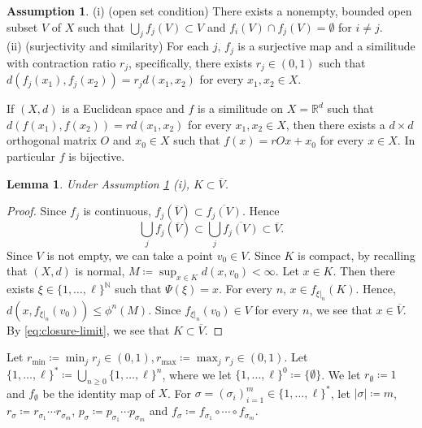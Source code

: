 \documentclass[a4paper, reqno, 11pt]{amsart}
\newtheorem{Lem}[Thm]{Lemma}
\theoremstyle{definition}
\newtheorem{Ass}[Thm]{Assumption}
\begin{document}
\begin{Ass}\label{ass:additional-f}
(i) (open set condition)  There exists a nonempty, bounded open subset $V$ of $X$ such that $\bigcup_j f_j (V) \subset V$ and 
$f_i (V) \cap f_j (V) = \emptyset$ for $i \ne j$. \\
(ii) (surjectivity and similarity) For each $j$, $f_j$ is a surjective map and a similitude with contraction ratio $r_j$, specifically, 
there exists $r_j \in (0,1)$ such that $d(f_j (x_1), f_j (x_2)) = r_j d(x_1, x_2)$ for every $x_1, x_2 \in X$. 
\end{Ass}

If $(X,d)$ is a Euclidean space and $f$ is a similitude on $X = \mathbb{R}^d$ such that $d(f(x_1), f(x_2)) = r d(x_1, x_2)$ for every $x_1, x_2 \in X$, 
then there exists a $d \times d$ orthogonal matrix $O$ and $x_0 \in X$ such that $f(x) = rOx + x_0$ for every $x \in X$. 
In particular $f$ is bijective. 

\begin{Lem}\label{lem:K-included}
Under Assumption \ref{ass:additional-f} (i), $K \subset \overline{V}$. 
\end{Lem}

\begin{proof}
Since $f_j$ is continuous, $f_j (\overline{V}) \subset \overline{f_j (V)}$. 
Hence  
\[ \bigcup_j f_j (\overline{V}) \subset \bigcup_j \overline{f_j (V)} \subset \overline{V}.\]  
Since $V$ is not empty, we can take a point $v_0 \in V$. 
Since $K$ is compact, by recalling that $(X,d)$ is normal, $M \coloneqq \sup_{x \in K} d(x, v_0) < \infty$. 
Let $x \in K$. 
Then  there exists $\xi \in \{1,\dots, \ell\}^{\mathbb N}$ such that $\Psi(\xi) = x$. 
For every $n$, $x \in f_{\xi|_n} (K)$. 
Hence, $d(x,  f_{\xi|_n}(v_0)) \le \phi^n (M)$. 
Since $ f_{\xi|_n}(v_0) \in V$ for every $n$, we see that $x \in \overline{V}$. 
By \eqref{eq:closure-limit}, we see that $K \subset \overline{V}$. 
\end{proof}

Let $r_{\min} \coloneqq \min_j r_j \in  (0,1), r_{\max} \coloneqq \max_j r_j \in (0,1)$. 
Let $\{1,\dots, \ell\}^{*} \coloneqq \bigcup_{n \ge 0} \{1,\dots, \ell\}^{n}$, where we let $\{1,\dots,\ell\}^{0} \coloneqq \{\emptyset\}$. 
We let $r_{\emptyset} \coloneqq 1$ and $f_{\emptyset}$ be the identity map of $X$. 
For $\sigma = (\sigma_i)_{i=1}^{m} \in  \{1,\dots, \ell\}^{*}$, 
let $|\sigma| \coloneqq m$, $r_{\sigma} \coloneqq r_{\sigma_1} \cdots r_{\sigma_m}$, $p_{\sigma} \coloneqq p_{\sigma_1} \cdots p_{\sigma_m}$ and $f_{\sigma} \coloneqq f_{\sigma_1} \circ \cdots \circ f_{\sigma_m}$. 
\end{document}
